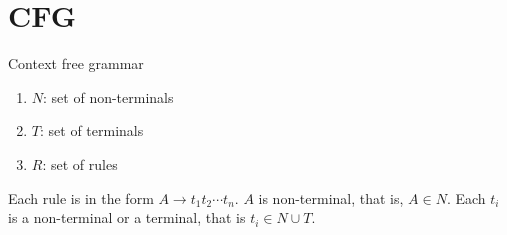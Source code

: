 \section{CFG}
Context free grammar

\begin{enumerate}
    \item $N$: set of non-terminals
    \item $T$: set of terminals
    \item $R$: set of rules
\end{enumerate}

Each rule is in the form $A \to t_1 t_2 \cdots t_n$.
$A$ is non-terminal, that is, $A \in N$.
Each $t_i$ is a non-terminal or a terminal, that is $t_i \in N \cup T$.
